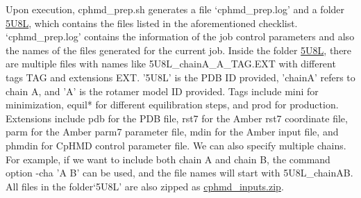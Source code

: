 Upon execution, cphmd\_prep.sh generates a file
`cphmd\_prep.log' and a folder
\href{https://gitlab.com/shenlab-amber-cphmd/cphmd-tutorial/-/tree/main/gphmd_Amber/gphmd_kinase_aphrex}{5U8L}, which
contains the files listed in the aforementioned checklist. 
`cphmd\_prep.log' contains the information of the job control parameters and also the names of the files generated for the current job. 
Inside the folder \href{https://gitlab.com/shenlab-amber-cphmd/cphmd-tutorial/-/tree/main/gphmd_Amber/gphmd_kinase_aphrex}{5U8L},
there are multiple files with names like 5U8L\_chainA\_A\_TAG.EXT with different tags TAG and extensions EXT. 
'5U8L' is the PDB ID provided, 'chainA' refers to chain A, and 'A' is the rotamer model ID  provided. Tags include mini for minimization, 
equil* for different equilibration steps, 
and prod for production. 
Extensions include pdb for the PDB file, 
rst7 for the Amber rst7 coordinate file, 
parm for the Amber parm7 parameter file, 
mdin for the Amber input file, 
and phmdin for CpHMD control parameter file. 
We can also specify multiple chains.   
For example, if we want to include both chain A and chain B, 
the command option -cha 'A B' can be used, 
and the file names will start with 5U8L\_chainAB. 
All files in the folder`5U8L' are also zipped as 
\href{https://gitlab.com/shenlab-amber-cphmd/cphmd-tutorial/-/tree/main/gphmd_Amber/gphmd_kinase_aphrex}{cphmd\_inputs.zip}.





